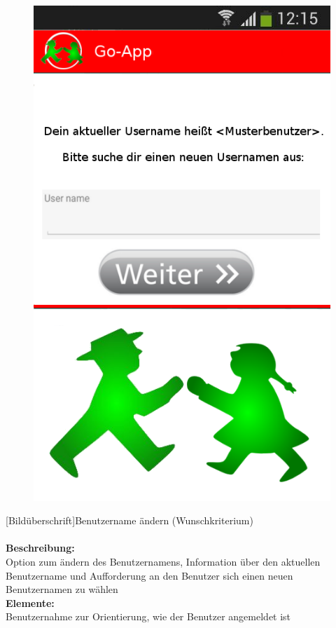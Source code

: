 \begin{figure}
	\includegraphics[scale =1]{resources/images/username_aendern.png}
\end{figure}
[Bildüberschrift]Benutzername ändern (Wunschkriterium)\\ \\
\textbf{Beschreibung:}\\
Option zum ändern des Benutzernamens, Information über den aktuellen Benutzername und Aufforderung an den Benutzer sich einen neuen Benutzernamen zu wählen\\
\textbf{Elemente:}\\
Benutzernahme zur Orientierung, wie der Benutzer angemeldet ist\\

